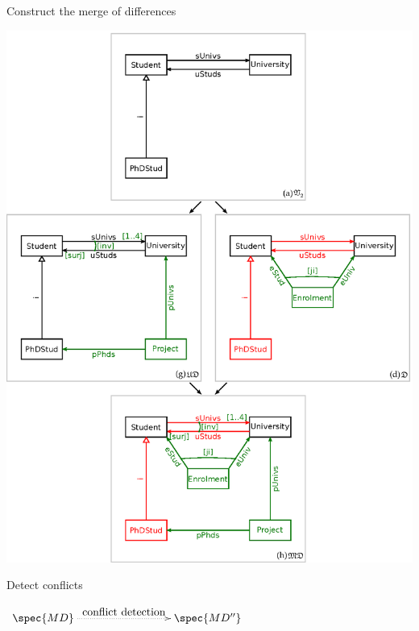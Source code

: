 \documentclass[dvips,slidetop,mathserif,brown]{beamer}
\begin{document}
\begin{frame}{Construct the merge of differences}
  \begin{center}
    \includegraphics[scale=0.35]{ex_project_vc_standard_md}
  \end{center}
\end{frame}

\begin{frame}{Detect conflicts}
  \begin{center}
    $\xymatrix{
      \spec{{MD}} \ar@{.>}[rrr]^-{\txt{conflict detection}} & & & \spec{{MD''}}
    }$
  \end{center}
\end{frame}
\end{document}
